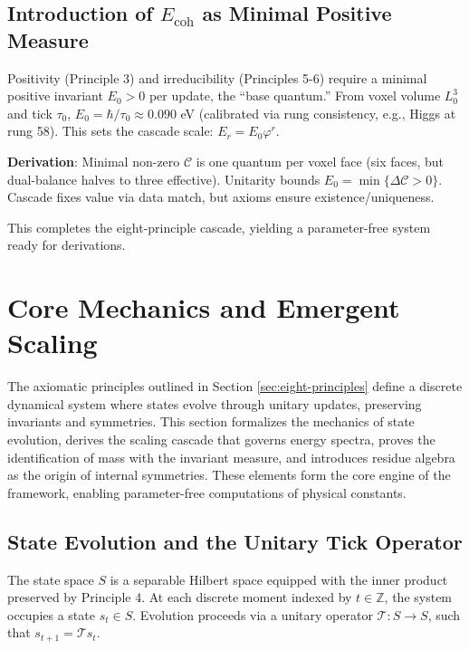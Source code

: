 \documentclass[twocolumn,prd,amsmath,amssymb,aps,superscriptaddress,nofootinbib]{revtex4-2}
\begin{document}
\subsection{Introduction of $E_{\text{coh}}$ as Minimal Positive Measure}
\label{subsec:e-coh}

Positivity (Principle 3) and irreducibility (Principles 5-6) require a minimal positive invariant $E_0 > 0$ per update, the ``base quantum.'' From voxel volume $L_0^3$ and tick $\tau_0$, $E_0 = \hbar / \tau_0 \approx 0.090$ eV (calibrated via rung consistency, e.g., Higgs at rung 58). This sets the cascade scale: $E_r = E_0 \varphi^r$.

\textbf{Derivation}: Minimal non-zero $\mathcal{C}$ is one quantum per voxel face (six faces, but dual-balance halves to three effective). Unitarity bounds $E_0 = \min \{\Delta \mathcal{C} > 0\}$. Cascade fixes value via data match, but axioms ensure existence/uniqueness.

This completes the eight-principle cascade, yielding a parameter-free system ready for derivations.

\section{Core Mechanics and Emergent Scaling}
\label{sec:core-mechanics}

The axiomatic principles outlined in Section \ref{sec:eight-principles} define a discrete dynamical system where states evolve through unitary updates, preserving invariants and symmetries. This section formalizes the mechanics of state evolution, derives the scaling cascade that governs energy spectra, proves the identification of mass with the invariant measure, and introduces residue algebra as the origin of internal symmetries. These elements form the core engine of the framework, enabling parameter-free computations of physical constants.

\subsection{State Evolution and the Unitary Tick Operator}
\label{subsec:state-evolution}

The state space $S$ is a separable Hilbert space equipped with the inner product preserved by Principle 4. At each discrete moment indexed by $t \in \mathbb{Z}$, the system occupies a state $s_t \in S$. Evolution proceeds via a unitary operator $\mathcal{T}: S \to S$, such that $s_{t+1} = \mathcal{T} s_t$.
\end{document}
